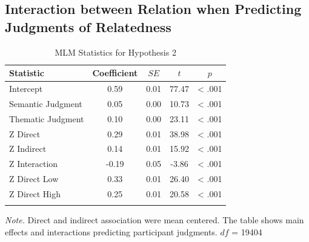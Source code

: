 \documentclass[english,,man]{apa6}
\begin{document}
\hypertarget{interaction-between-relation-when-predicting-judgments-of-relatedness}{%
\subsection{Interaction between Relation when Predicting Judgments of Relatedness}\label{interaction-between-relation-when-predicting-judgments-of-relatedness}}

\begin{table}[tbp]
\begin{center}
\begin{threeparttable}
\caption{\label{tab:hyp2-table}MLM Statistics for Hypothesis 2}
\begin{tabular}{lcccc}
\toprule
Statistic & \multicolumn{1}{c}{Coefficient} & \multicolumn{1}{c}{$SE$} & \multicolumn{1}{c}{$t$} & \multicolumn{1}{c}{$p$}\\
\midrule
Intercept & 0.59 & 0.01 & 77.47 & < .001\\
Semantic Judgment & 0.05 & 0.00 & 10.73 & < .001\\
Thematic Judgment & 0.10 & 0.00 & 23.11 & < .001\\
Z Direct & 0.29 & 0.01 & 38.98 & < .001\\
Z Indirect & 0.14 & 0.01 & 15.92 & < .001\\
Z Interaction & -0.19 & 0.05 & -3.86 & < .001\\
Z Direct Low & 0.33 & 0.01 & 26.40 & < .001\\
Z Direct High & 0.25 & 0.01 & 20.58 & < .001\\
\bottomrule
\addlinespace
\end{tabular}
\begin{tablenotes}[para]
\normalsize{\textit{Note.} Direct and indirect association  were mean centered. The table shows main effects and interactions predicting participant judgments. $df$ = 19404}
\end{tablenotes}
\end{threeparttable}
\end{center}
\end{table}
\end{document}
